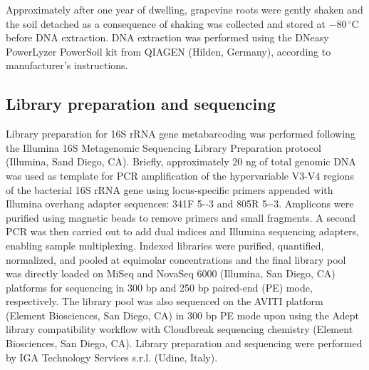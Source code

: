 \documentclass[12pt]{article}
\theoremstyle{thmstyleone}%
\theoremstyle{thmstyletwo}%
\theoremstyle{thmstylethree}%
\begin{document}
Approximately after one year of dwelling, grapevine roots were gently shaken and the soil detached as a consequence of shaking was collected and stored at $-80\,^{\circ}\text{C}$ before DNA extraction. DNA extraction was performed using the DNeasy PowerLyzer PowerSoil kit from QIAGEN (Hilden, Germany), according to manufacturer's instructions.


\subsection{Library preparation and sequencing}
Library preparation for 16S rRNA gene metabarcoding was performed following the Illumina 16S Metagenomic Sequencing Library Preparation protocol (Illumina, Sand Diego, CA). Briefly, approximately 20 ng of total genomic DNA was used as template for PCR amplification of the hypervariable V3-V4 regions of the bacterial 16S rRNA gene using locus-specific primers appended with Illumina overhang adapter sequences: 341F 5--3 and 805R 5--3. Amplicons were purified using magnetic beads to remove primers and small fragments. A second PCR was then carried out to add dual indices and Illumina sequencing adapters, enabling sample multiplexing. Indexed libraries were purified, quantified, normalized, and pooled at equimolar concentrations and the final library pool was directly loaded on MiSeq and NovaSeq 6000 (Illumina, San Diego, CA) platforms for sequencing in 300 bp and 250 bp paired-end (PE) mode, respectively. The library pool was also sequenced on the AVITI platform (Element Biosciences, San Diego, CA) in 300 bp PE mode upon using the Adept library compatibility workflow with Cloudbreak sequencing chemistry (Element Biosciences, San Diego, CA). Library preparation and sequencing were performed by IGA Technology Services s.r.l. (Udine, Italy).
\end{document}
